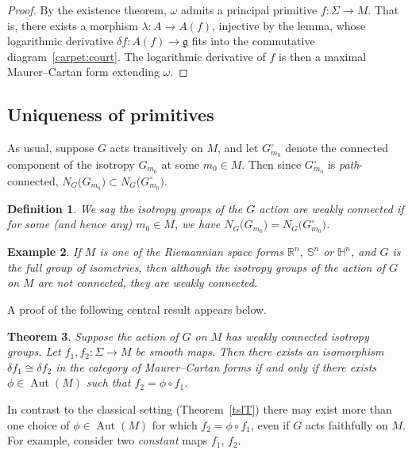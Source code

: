 \documentclass[10pt,a4paper]{amsart}
\numberwithin{equation}{section}
\newtheorem{Theorem}{Theorem}[section]
\newtheorem{Definition}[Theorem]{Definition}
\newtheorem{Example}[Theorem]{Example}
\DeclareMathOperator{\automorphism}{Aut}
\begin{document}
\begin{proof} By the existence theorem, $\omega $ admits a principal
 primitive $f \colon\! \Sigma \rightarrow M$. That is, there exists a
 morphism $\lambda \colon\! A \rightarrow A(f)$, injective by the
 lemma, whose logarithmic derivative
 $\delta f \colon\! A(f) \rightarrow {\mathfrak g} $ fits into the
 commutative diagram~\eqref{carpet:court}. The logarithmic
 derivative of $f$ is then a maximal Maurer--Cartan form extending
 $\omega $.
\end{proof}

\subsection*{Uniqueness of primitives}%

As usual, suppose $G$ acts transitively on $M$, and let
$G_{m_0}^\circ $ denote the connected component of the isotropy
$G_{m_0}$ at some $m_0 \in M$. Then since $G_{m_0}^\circ$ is {\em
 path}-connected, $N_G\big(G_{m_0}\big)\subset N_G\big(G_{m_0}^\circ\big)$.
\begin{Definition}%
 We say the isotropy groups of the $G$ action are {\it weakly
 connected} if for some (and hence any) $m_0 \in M$, we have
 $N_G\big(G_{m_0}\big)=N_G\big(G_{m_0}^\circ\big)$.
\end{Definition}

\begin{Example} If $M $ is one of the Riemannian space forms ${\mathbb
R}^n$, ${\mathbb S}^n$ or ${\mathbb H}^n $, and $G$ is the full group of
isometries, then although the isotropy groups of the action of $G$ on
$M$ are not connected, they {\em are} weakly connected.
\end{Example}
A proof of the following central result appears below.

\begin{Theorem}\label{uniquenessT}
 Suppose the action of $G$ on $M$ has weakly connected isotropy
 groups. Let $f_1, f_2 \colon \Sigma \rightarrow M$ be smooth
 maps. Then there exists an isomorphism $\delta f_1 \cong \delta f_2$
 in the category of Maurer--Cartan forms {\em if and only if} there
 exists $\phi \in \automorphism(M)$ such that
 $f_2 = \phi \circ f_1$.
\end{Theorem}

In contrast to the classical setting (Theorem~\ref{tslT})
there may exist more than one choice of $\phi \in \automorphism(M)$
for which $f_2 = \phi \circ f_1$, even if $G$ acts faithfully on
$M$. For example, consider two {\em constant} maps $f_1$, $f_2$.
\end{document}
